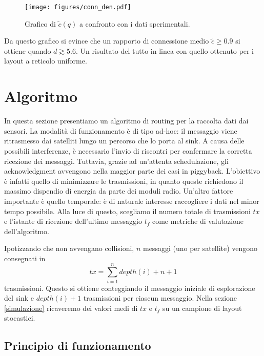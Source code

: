 \documentclass[a4paper,12pt]{article}
\theoremstyle{definition}
\begin{document}
\begin{figure}[H]
\centering
\texttt{[image: figures/conn\_den.pdf]}
\caption{Grafico di $\tilde{c}(q)$ a confronto con i dati sperimentali.}
\end{figure}

Da questo grafico si evince che un rapporto di connessione medio $\tilde{c} \geq 0.9$ si ottiene quando $d \gtrsim 5.6$. Un risultato del tutto in linea con quello ottenuto per i layout a reticolo uniforme.

\section{Algoritmo}


In questa sezione presentiamo un algoritmo di routing per la raccolta dati dai sensori. La modalità di funzionamento è di tipo ad-hoc: il messaggio viene ritrasmesso dai satelliti lungo un percorso che lo porta al sink. A causa delle possibili interferenze, è necessario l'invio di riscontri per confermare la corretta ricezione dei messaggi. Tuttavia, grazie ad un'attenta schedulazione, gli acknowledgment avvengono nella maggior parte dei casi in piggyback. L'obiettivo è infatti quello di minimizzare le trasmissioni, in quanto queste richiedono il massimo dispendio di energia da parte dei moduli radio. Un'altro fattore importante è quello temporale: è di naturale interesse raccogliere i dati nel minor tempo possibile. Alla luce di questo, scegliamo il numero totale di trasmissioni $tx$ e l'istante di ricezione dell'ultimo messaggio $t_f$ come metriche di valutazione dell'algoritmo.

Ipotizzando che non avvengano collisioni, $n$ messaggi (uno per satellite) vengono consegnati in
\begin{equation*}
tx = \sum_{i=1}^{n} depth(i) + n + 1
\end{equation*}
trasmissioni. Questo si ottiene conteggiando il messaggio iniziale di esplorazione del sink e $depth(i) + 1$ trasmissioni per ciascun messaggio. Nella sezione \ref{simulazione} ricaveremo dei valori medi di $tx$ e $t_f$ su un campione di layout stocastici.

\subsection{Principio di funzionamento}
\end{document}
